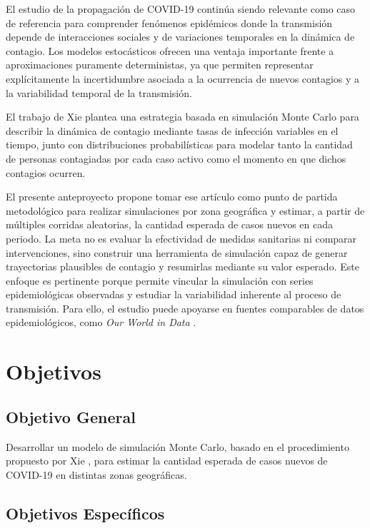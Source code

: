 \documentclass[12pt]{article}
\begin{document}
El estudio de la propagación de COVID-19 continúa siendo relevante como caso de
referencia para comprender fenómenos epidémicos donde la transmisión depende de
interacciones sociales y de variaciones temporales en la dinámica de contagio.
Los modelos estocásticos ofrecen una ventaja importante frente a aproximaciones
puramente deterministas, ya que permiten representar explícitamente la
incertidumbre asociada a la ocurrencia de nuevos contagios y a la variabilidad
temporal de la transmisión.

El trabajo de Xie \cite{Xie2020} plantea una estrategia basada en simulación
Monte Carlo para describir la dinámica de contagio mediante tasas de infección
variables en el tiempo, junto con distribuciones probabilísticas para modelar
tanto la cantidad de personas contagiadas por cada caso activo como el momento
en que dichos contagios ocurren.

El presente anteproyecto propone tomar ese artículo como punto de partida
metodológico para realizar simulaciones por zona geográfica y estimar, a partir
de múltiples corridas aleatorias, la cantidad esperada de casos nuevos en cada
periodo. La meta no es evaluar la efectividad de medidas sanitarias ni comparar
intervenciones, sino construir una herramienta de simulación capaz de generar
trayectorias plausibles de contagio y resumirlas mediante su valor esperado.
Este enfoque es pertinente porque permite vincular la simulación con series
epidemiológicas observadas y estudiar la variabilidad inherente al proceso de
transmisión. Para ello, el estudio puede apoyarse en fuentes comparables de
datos epidemiológicos, como \textit{Our World in Data}
\cite{owid-coronavirus}.

\newpage

\section{Objetivos}

\subsection{Objetivo General}

Desarrollar un modelo de simulación Monte Carlo, basado en el procedimiento
propuesto por Xie \cite{Xie2020}, para estimar la cantidad esperada de casos
nuevos de COVID-19 en distintas zonas geográficas.

\subsection{Objetivos Específicos}
\end{document}
